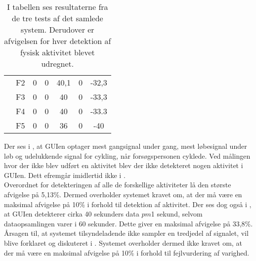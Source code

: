 \begin{table}[H]
{\begin{tabular}{ccccccc}
		& F2             & 0                                                                                                & 0                                                                                                & 40,1       & 0 & -32,3                                                                                             \\
		& F3             & 0                                                                                                  & 0                                                                                                & 40      & 0   & -33,3                                                                                           \\
		& F4             & 0                                                                                                  & 0                                                                                                & 40    & 0   & -33.3                                                                                              \\
		& F5             & 0                                                                                                  & 0                                                                                                & 36 & 0 & -40  \\ \hline                                                                                                
		\end{tabular}
	}
		\caption{I tabellen ses resultaterne fra de tre tests af det samlede system. Derudover er afvigelsen for hver detektion af fysisk aktivitet blevet udregnet.}
		\label{tab:samlet_sys_test1}
\end{table}\vspace{-.5cm}
Der ses i , at GUIen optager mest gangsignal under gang, mest løbesignal under løb og udelukkende signal for cykling, når forsøgspersonen cyklede. Ved målingen hvor der ikke blev udført en aktivitet blev der ikke detekteret nogen aktivitet i GUIen. Dett efremgår imidlertid ikke i . \\
Overordnet for detekteringen af alle de forskellige aktiviteter lå den største afvigelse på 5,13\%. Dermed overholder systemet kravet om, at der må være en maksimal afvigelse på 10\% i forhold til detektion af aktivitet. Der ses dog også i , at GUIen detekterer cirka 40 sekunders data $pm$1 sekund, selvom dataopsamlingen varer i 60 sekunder. Dette giver en maksimal afvigelse på 33,8\%. Årsagen til, at systemet tilsyndeladende ikke sampler en tredjedel af signalet, vil blive forklaret og diskuteret i . Systemet overholder dermed ikke kravet om, at der må være en maksimal afvigelse på 10\% i forhold til fejlvurdering af varighed.

